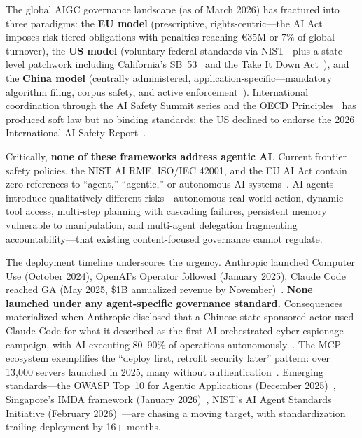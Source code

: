 The global AIGC governance landscape (as of March 2026) has fractured into three paradigms: the \textbf{EU model} (prescriptive, rights-centric---the AI Act~\cite{euaiact2024} imposes risk-tiered obligations with penalties reaching \euro35M or 7\% of global turnover), the \textbf{US model} (voluntary federal standards via NIST~\cite{nistrmf} plus a state-level patchwork including California's SB~53~\cite{casb53} and the Take It Down Act~\cite{takeitdown2025}), and the \textbf{China model} (centrally administered, application-specific---mandatory algorithm filing, corpus safety, and active enforcement~\cite{chinainterim2023,tc260}). International coordination through the AI Safety Summit series and the OECD Principles~\cite{oecdai2024} has produced soft law but no binding standards; the US declined to endorse the 2026 International AI Safety Report~\cite{time2026usretreat}.

Critically, \textbf{none of these frameworks address agentic AI}. Current frontier safety policies, the NIST AI RMF, ISO/IEC 42001, and the EU AI Act contain zero references to ``agent,'' ``agentic,'' or autonomous AI systems~\cite{zenity2025blindspot}. AI agents introduce qualitatively different risks---autonomous real-world action, dynamic tool access, multi-step planning with cascading failures, persistent memory vulnerable to manipulation, and multi-agent delegation fragmenting accountability---that existing content-focused governance cannot regulate.

The deployment timeline underscores the urgency. Anthropic launched Computer Use (October 2024), OpenAI's Operator followed (January 2025), Claude Code reached GA (May 2025, \$1B annualized revenue by November)~\cite{anthropic2024computeruse,openaicopilot}. \textbf{None launched under any agent-specific governance standard.} Consequences materialized when Anthropic disclosed that a Chinese state-sponsored actor used Claude Code for what it described as the first AI-orchestrated cyber espionage campaign, with AI executing 80--90\% of operations autonomously~\cite{anthropic2025gtg1002}. The MCP ecosystem exemplifies the ``deploy first, retrofit security later'' pattern: over 13,000 servers launched in 2025, many without authentication~\cite{zenity2025mcp}. Emerging standards---the OWASP Top~10 for Agentic Applications (December 2025)~\cite{owasp2025agentic}, Singapore's IMDA framework (January 2026)~\cite{imda2026agentic}, NIST's AI Agent Standards Initiative (February 2026)~\cite{nist2026agentstandards}---are chasing a moving target, with standardization trailing deployment by 16+ months.


